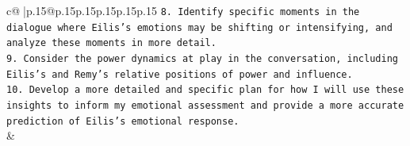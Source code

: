 \documentclass{article}
\begin{document}
{\begin{supertabular}{c@{$\;$}|p{.15\linewidth}@{}p{.15\linewidth}p{.15\linewidth}p{.15\linewidth}p{.15\linewidth}p{.15\linewidth}}
{{{\texttt{8. Identify specific moments in the dialogue where Eilis's emotions may be shifting or intensifying, and analyze these moments in more detail.} \\
\texttt{9. Consider the power dynamics at play in the conversation, including Eilis's and Remy's relative positions of power and influence.} \\
\texttt{10. Develop a more detailed and specific plan for how I will use these insights to inform my emotional assessment and provide a more accurate prediction of Eilis's emotional response.} \\
            }
        }
    }
    & \\ \\

\end{supertabular}
}
\end{document}

